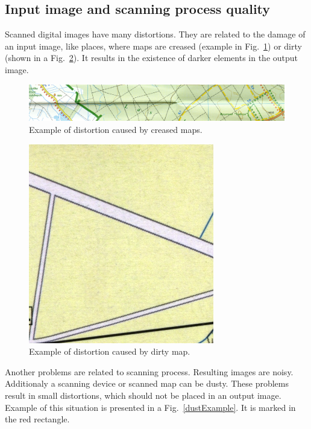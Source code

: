\documentclass[a4paper,onecolumn,oneside,12pt]{memoir}
\begin{document}
\subsection{Input image and scanning process quality}

Scanned digital images have many distortions. They are related to the damage of an input image, like
places, where maps are creased (example in Fig.~\ref{creaseExample}) or dirty (shown in a 
Fig.~\ref{dirtyExample}). It results in the existence of darker elements in the output image.

\begin{figure}[!ht]
\begin{center}
\includegraphics[scale=1.1]{images/creaseExample.jpg}
\caption{Example of distortion caused by creased maps.}
\label{creaseExample}
\end{center}
\end{figure}

\begin{figure}[!ht]
\begin{center}
\includegraphics[scale=3.0]{images/dirtyExample.jpg}
\caption{Example of distortion caused by dirty map.}
\label{dirtyExample}
\end{center}
\end{figure}

Another problems are related to scanning process. Resulting images are noisy. Additionaly a
scanning device or scanned map can be dusty. These problems result in small distortions, which
should not be placed in an output image. Example of this situation is presented in a 
Fig.~\ref{dustExample}. It is marked in the red rectangle.
\end{document}
